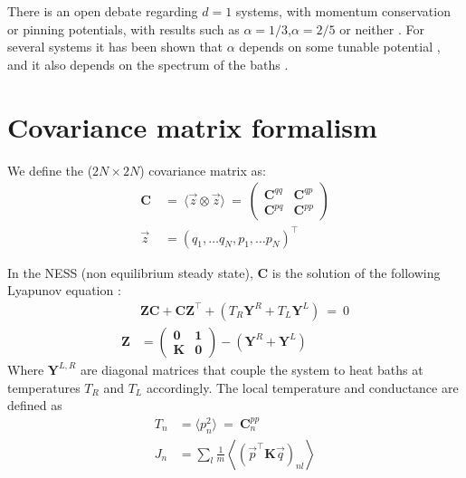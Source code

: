 There is an open debate regarding $d=1$ systems,
with momentum conservation or pinning potentials, 
with results such as $\alpha=1/3$,$\alpha=2/5$ or neither
\cite{narayan_anomalous_2002,delfini_comment_2008,dhar_dhar_2008,wang_power-law_2011,basile_momentum_2006}.
For several systems it has been shown that $\alpha$ depends on some tunable potential \cite{tong_wave_1999},
and it also depends on the spectrum of the baths \cite{dhar_heat_2001}.




\section{Covariance matrix formalism}

We define the ($2N\times 2N$) covariance matrix as:
\begin{align}
\mathbf{C} \ &=\ \langle \vec{z}\otimes \vec{z}\rangle \ =\ 
              \begin{pmatrix} 
                \mathbf{C}^{qq} & \mathbf{C}^{qp} \\
                \mathbf{C}^{pq} & \mathbf{C}^{pp}
            \end{pmatrix}
\\
\vec{z} &= (q_1,\ldots q_N, p_1,\ldots p_N)^\intercal
\end{align}


In the NESS (non equilibrium steady state), $\mathbf{C}$ 
is the solution of the following Lyapunov equation 
\cite{bodyfelt_unpub,zheng,zheng_heat_2011,bhatia_how_1997,dhar_heat_2008,rieder_properties_1967,*nakazawa_energy_1968,*matsuda_localization_1970}:
%
\begin{align}
&\mathbf{Z}\mathbf{C} + \mathbf{C}\mathbf{Z}^\intercal + (T_R\mathbf{Y}^R+T_L\mathbf{Y}^L) \ =\  0\\
\mathbf{Z} &= 
              \begin{pmatrix} 
                \mathbf{0} & \mathbf{1} \\
                \mathbf{K} & \mathbf{0} 
              \end{pmatrix} -(\mathbf{Y}^R+\mathbf{Y}^L)
\end{align}
%
Where $\mathbf{Y}^{L,R}$ are diagonal matrices that couple
the system to heat baths at temperatures $T_R$ and $T_L$ accordingly.
%
The local temperature and conductance are defined as
\begin{align}
T_n &= \langle p_n^2 \rangle \ = \ \mathbf{C}^{pp}_{n} \\
J_n &= \sum_l\frac{1}{m}\left\langle \left(\vec{p}^{\intercal} \mathbf{K} \vec{q}\right)_{nl} \right\rangle
\end{align}


